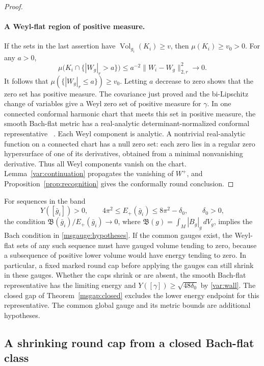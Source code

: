 \documentclass[11pt]{article}
\numberwithin{equation}{section}
\theoremstyle{definition}
\theoremstyle{remark}
\DeclareMathOperator{\Vol}{Vol}
\begin{document}
\begin{proof}
\paragraph{A Weyl-flat region of positive measure.}
If the sets in the last assertion have \(\Vol_{g_i}(K_i)\ge v\), then
\(\mu(K_i)\ge v_0>0\). For any \(a>0\),
\[
 \mu\big(K_i\cap\{|W_g|_r>a\}\big)
   \le a^{-2}\|W_i-W_g\|_{2,r}^2\longrightarrow0 .
\]
It follows that \(\mu(\{|W_g|_r\le a\})\ge v_0\). Letting \(a\)
decrease to zero shows that the zero set has positive measure.
The covariance just proved and the bi-Lipschitz change of variables
give a Weyl zero set of positive measure for \(\gamma\).
In one connected conformal harmonic chart that meets this set
in positive measure, the smooth Bach-flat metric has a real-analytic
determinant-normalized conformal representative%
~\cite[Theorems 2.2 and 3.7(c)]{LassasLiimatainen2019ConformalHarmonic}.
Each Weyl component is analytic. A nontrivial real-analytic function
on a connected chart has a null zero set: each zero lies in a
regular zero hypersurface of one of its derivatives, obtained
from a minimal nonvanishing derivative. Thus all Weyl components
vanish on the chart. Lemma~\ref{var:continuation} propagates the
vanishing of \(W^+\), and Proposition~\ref{prop:recognition} gives
the conformally round conclusion.
\end{proof}

For sequences in the band
\[
 Y([\bar g_i])>0,\qquad
 4\pi^2\le E_+(\bar g_i)\le 8\pi^2-\delta_0,\qquad \delta_0>0,
\]
the condition \(\mathfrak B(\bar g_i)/E_+(\bar g_i)\to0\), where
\(\mathfrak B(g)=\int_M|B_g|_g\,dV_g\), implies the Bach condition
in \eqref{msgauge:hypotheses}. If the common gauges exist, the
Weyl-flat sets of any such sequence must have gauged volume tending
to zero, because a subsequence of positive lower volume would
have energy tending to zero. In particular, a fixed marked round
cap before applying the gauges can still shrink in these gauges.
Whether the caps shrink or are absent, the smooth Bach-flat
representative has the limiting energy and
\(Y([\gamma])\ge\sqrt{48\delta_0}\) by \eqref{var:wall}.
The closed gap of Theorem~\ref{msgap:closed} excludes the lower
energy endpoint for this representative. The common global
gauge and its metric bounds are additional hypotheses.

\subsection{A shrinking round cap from a closed Bach-flat class}
\end{document}
